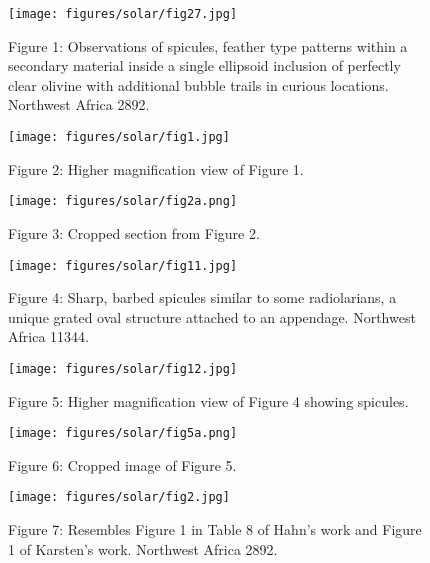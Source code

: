 \documentclass[a4paper, 12pt, oneside]{article}
\begin{document}
\begin{figure}[b]
\texttt{[image: figures/solar/fig27.jpg]}
\caption{Figure 1: Observations of spicules, feather type patterns within a secondary material inside a single ellipsoid inclusion of perfectly clear olivine with additional bubble trails in curious locations. Northwest Africa 2892.}
\centering
\end{figure}
\clearpage

\begin{figure}[b]
\centering
\texttt{[image: figures/solar/fig1.jpg]}
\caption{Figure 2: Higher magnification view of Figure 1.}
\end{figure}
\clearpage

\begin{figure}[b]
\texttt{[image: figures/solar/fig2a.png]}
\caption{Figure 3: Cropped section from Figure 2.}
\centering
\end{figure}
\clearpage

\begin{figure}[b]
\texttt{[image: figures/solar/fig11.jpg]}
\caption{Figure 4: Sharp, barbed spicules similar to some radiolarians, a unique grated oval structure attached to an appendage. Northwest Africa 11344.}
\centering
\end{figure}
\clearpage

\begin{figure}[b]
\centering
\texttt{[image: figures/solar/fig12.jpg]}
\caption{Figure 5: Higher magnification view of Figure 4 showing spicules.}
\end{figure}
\clearpage

\begin{figure}[b]
\centering
\texttt{[image: figures/solar/fig5a.png]}
\caption{Figure 6: Cropped image of Figure 5.}
\end{figure}
\clearpage

\begin{figure}[b]
\texttt{[image: figures/solar/fig2.jpg]}
\caption{Figure 7: Resembles Figure 1 in Table 8 of Hahn's work and Figure 1 of Karsten's work. Northwest Africa 2892.}
\centering
\end{figure}
\clearpage
\end{document}
